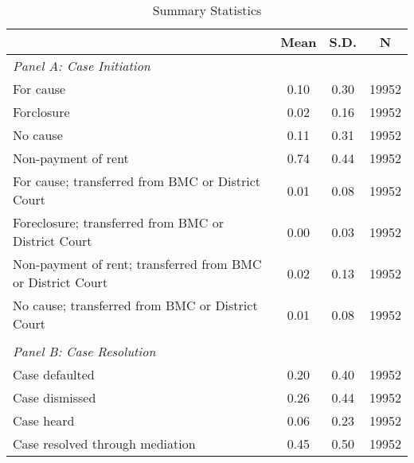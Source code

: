 \begin{table}[htbp]\centering
\def\sym#1{\ifmmode^{#1}\else\(^{#1}\)\fi}
\caption{Summary Statistics}
\begin{tabular}{l*{1}{ccc}}
\toprule
                    &        Mean&        S.D.&           N\\
\midrule
\emph{Panel A: Case Initiation}&            &            &            \\
\hspace{0.25cm}For cause&        0.10&        0.30&       19952\\
\hspace{0.25cm}Forclosure&        0.02&        0.16&       19952\\
\hspace{0.25cm}No cause&        0.11&        0.31&       19952\\
\hspace{0.25cm}Non-payment of rent&        0.74&        0.44&       19952\\
\hspace{0.25cm}For cause; transferred from BMC or District Court&        0.01&        0.08&       19952\\
\hspace{0.25cm}Foreclosure; transferred from BMC or District Court&        0.00&        0.03&       19952\\
\hspace{0.25cm}Non-payment of rent; transferred from BMC or District Court&        0.02&        0.13&       19952\\
\hspace{0.25cm}No cause; transferred from BMC or District Court&        0.01&        0.08&       19952\\
\vspace{0.1em} \\ \emph{Panel B: Case Resolution}&            &            &            \\
\hspace{0.25cm}Case defaulted&        0.20&        0.40&       19952\\
\hspace{0.25cm}Case dismissed&        0.26&        0.44&       19952\\
\hspace{0.25cm}Case heard&        0.06&        0.23&       19952\\
\hspace{0.25cm}Case resolved through mediation&        0.45&        0.50&       19952\\

\end{tabular}
\end{table}

